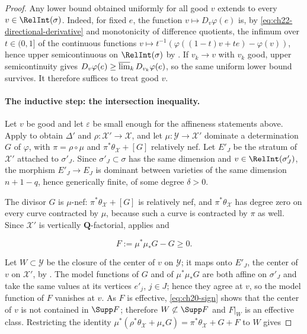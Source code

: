 \begin{proof}
Any lower bound obtained uniformly for all good $v$ extends to every
$v\in\RelInt(\sigma)$.  Indeed, for fixed $e$, the function
$v\mapsto D_v\varphi(e)$ is, by
\eqref{eq:ch22-directional-derivative} and monotonicity of difference
quotients, the infimum over $t\in(0,1]$ of the continuous functions
$v\mapsto t^{-1}(\varphi((1-t)v+te)-\varphi(v))$, hence upper
semicontinuous on $\RelInt(\sigma)$ by
.  If $v_k\to v$ with $v_k$ good, upper
semicontinuity gives
$D_v\varphi(e)\geq\varlimsup_kD_{v_k}\varphi(e)$, so the same uniform
lower bound survives.  It therefore suffices to treat good $v$.

\paragraph{The inductive step: the intersection inequality.}
Let $v$ be good and let $\varepsilon$ be small enough for the affineness
statements above.  Apply  to obtain
$\Delta'$ and $\rho:\mathcal X'\to\mathcal X$, and let
$\mu:\mathcal Y\to\mathcal X'$ dominate a determination $G$ of
$\varphi$, with $\pi=\rho\circ\mu$ and $\pi^*\theta_{\mathcal X}+[G]$
relatively nef.  Let $E'_J$ be the stratum of $\mathcal X'$ attached to
$\sigma'_J$.  Since $\sigma'_J\subset\sigma$ has the same dimension and
$v\in\RelInt(\sigma'_J)$, the morphism $E'_J\to E_J$ is dominant between
varieties of the same dimension $n+1-q$, hence generically finite, of some
degree $\delta>0$.

The divisor $G$ is $\mu$-nef: $\pi^*\theta_{\mathcal X}+[G]$ is
relatively nef, and $\pi^*\theta_{\mathcal X}$ has degree zero on every
curve contracted by $\mu$, because such a curve is contracted by
$\pi$ as well.  Since $\mathcal X'$ is vertically
$\mathbf Q$-factorial,  applies and

\[
 F:=\mu^*\mu_*G-G\geq0 .
\tag{22.45}\label{eq:ch22-negativity-application}
\]

Let $W\subset\mathcal Y$ be the closure of the center of $v$ on
$\mathcal Y$; it maps onto $E'_J$, the center of $v$ on
$\mathcal X'$, by .  The model
functions of $G$ and of $\mu^*\mu_*G$ are both affine on $\sigma'_J$
and take the same values at its vertices $e'_j$, $j\in J$; hence they
agree at $v$, so the model function of $F$ vanishes at $v$.  As $F$
is effective, \eqref{eq:ch20-sign} shows that the center of $v$ is not
contained in $\Supp F$; therefore $W\not\subset\Supp F$ and $F|_W$ is
an effective class.  Restricting the identity
$\mu^*(\rho^*\theta_{\mathcal X}+\mu_*G)
=\pi^*\theta_{\mathcal X}+G+F$ to $W$ gives


\end{proof}
